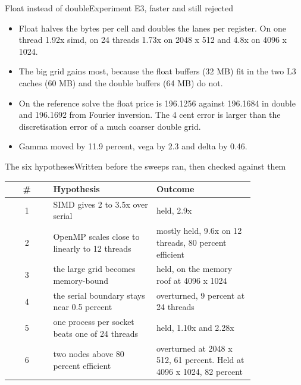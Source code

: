 \documentclass[aspectratio=169,11pt]{beamer}
\newcommand{\gSimd}{2.9}
\newcommand{\twoNodeEff}{61}
\newcommand{\twoNodeEffBig}{82}
\newcommand{\boundaryShare}{9}
\newcommand{\floatGainSmall}{1.73}
\newcommand{\floatGainBig}{4.8}
\newcommand{\rankPerSocketGain}{2.28}
\newcommand{\sigtable}[3]{%
  \begingroup
  \renewcommand{\arraystretch}{1.12}%
  \begin{table}\small
    \begin{tabular}{#1}
      \toprule
      #2 \\
      \midrule
      #3
      \bottomrule
    \end{tabular}
  \end{table}%
  \endgroup
}
\begin{document}
\begin{frame}{Float instead of double}{Experiment E3, faster and still rejected}
  {\small
  \begin{itemize}
    \item Float halves the bytes per cell and doubles the lanes per register. On one thread 1.92x simd, on 24 threads \floatGainSmall x on 2048 x 512 and \floatGainBig x on 4096 x 1024.
    \item The big grid gains most, because the float buffers (32 MB) fit in the two L3 caches (60 MB) and the double buffers (64 MB) do not.
    \item On the reference solve the float price is 196.1256 against 196.1684 in double and 196.1692 from Fourier inversion. The 4 cent error is larger than the discretisation error of a much coarser double grid.
    \item Gamma moved by 11.9 percent, vega by 2.3 and delta by 0.46.
  \end{itemize}}
\end{frame}

\begin{frame}{The six hypotheses}{Written before the sweeps ran, then checked against them}
  \sigtable{c >{\raggedright\arraybackslash}p{0.42\linewidth} >{\raggedright\arraybackslash}p{0.4\linewidth}}{\textbf{\#} & \textbf{Hypothesis} & \textbf{Outcome}}{%
    1 & SIMD gives 2 to 3.5x over serial & held, \gSimd x \\
    2 & OpenMP scales close to linearly to 12 threads & mostly held, 9.6x on 12 threads, 80 percent efficient \\
    3 & the large grid becomes memory-bound & held, on the memory roof at 4096 x 1024 \\
    4 & the serial boundary stays near 0.5 percent & overturned, \boundaryShare{} percent at 24 threads \\
    5 & one process per socket beats one of 24 threads & held, 1.10x and \rankPerSocketGain x \\
    6 & two nodes above 80 percent efficient & overturned at 2048 x 512, \twoNodeEff{} percent. Held at 4096 x 1024, \twoNodeEffBig{} percent \\}
\end{frame}
\end{document}
